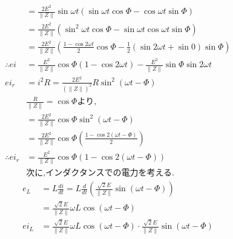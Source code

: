 \documentclass[twocolumn]{article}
\begin{document}
\begin{enumerate}
\begin{align*}
                          & = \frac{2E^2}{\|Z\|}\sin\omega t \left( \sin \omega t \cos \Phi - \cos \omega t \sin \Phi \right)                                        \\
                          & = \frac{2E^2}{\|Z\|} \left( \sin^2\omega t \cos \Phi - \sin \omega t \cos \omega t \sin \Phi \right)                                     \\
                          & = \frac{2E^2}{\|Z\|} \left( \frac{1 - \cos 2 \omega t}{2} \cos \Phi - \frac{1}{2} \left( \sin2\omega t  + \sin 0\right)\sin \Phi \right) \\
          \therefore ei   & = \frac{E^2}{\|Z\|} \cos \Phi \left(1-\cos2\omega t\right) - \frac{E^2}{\|Z\|} \sin\Phi \sin 2 \omega t                                  \\
          ei_r            & = i^2 R = \frac{2E^2}{(\|Z\|)^2}R\sin^2\left(\omega t -\Phi\right)                                                                       \\
                          & \frac{R}{\|Z\|} = \cos \Phi\text{より,}                                                                                                    \\
                          & = \frac{2E^2}{\|Z\|} \cos \Phi \sin^2\left(\omega t - \Phi\right)                                                                        \\
                          & = \frac{2E^2}{\|Z\|} \cos \Phi \left( \frac{1 - \cos 2 \left(\omega t - \Phi\right)}{2} \right)                                          \\
          \therefore ei_r & = \frac{E^2}{\|Z\|} \cos \Phi \left( 1 - \cos 2 \left(\omega t - \Phi\right)\right)                                                      \\
                          & \text{次に,インダクタンスでの電力を考える.}
        \end{align*}
        \begin{align*}
          e_L             & = L \frac{di}{dt} = L \frac{d}{dt} \left( \frac{\sqrt{2}E}{\|Z\|}\sin \left( \omega t - \Phi\right)\right)                          \\
                          & = \frac{\sqrt{2}E}{\|Z\|}\omega L \cos \left(\omega t - \Phi\right)                                                                 \\
          ei_L            & = \frac{\sqrt{2}E}{\|Z\|}\omega L \cos \left(\omega t - \Phi\right) \cdot \frac{\sqrt{2}E}{\|Z\|}\sin \left( \omega t - \Phi\right) \\

\end{align*}
\end{enumerate}
\end{document}
